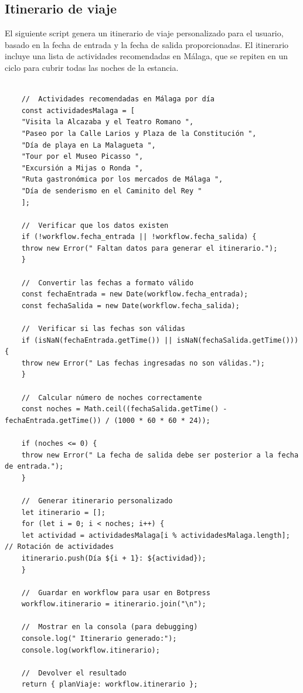 \documentclass[12pt]{article}
\begin{document}
\subsection{Itinerario de viaje}

El siguiente script genera un itinerario de viaje personalizado para el usuario, basado en la fecha de entrada y la fecha de salida proporcionadas.
El itinerario incluye una lista de actividades recomendadas en Málaga, que se repiten en un ciclo para cubrir todas las noches de la estancia.

\begin{verbatim}

    //  Actividades recomendadas en Málaga por día
    const actividadesMalaga = [
    "Visita la Alcazaba y el Teatro Romano ",
    "Paseo por la Calle Larios y Plaza de la Constitución ",
    "Día de playa en La Malagueta ",
    "Tour por el Museo Picasso ",
    "Excursión a Mijas o Ronda ",
    "Ruta gastronómica por los mercados de Málaga ",
    "Día de senderismo en el Caminito del Rey "
    ];

    //  Verificar que los datos existen
    if (!workflow.fecha_entrada || !workflow.fecha_salida) {
    throw new Error(" Faltan datos para generar el itinerario.");
    }

    //  Convertir las fechas a formato válido
    const fechaEntrada = new Date(workflow.fecha_entrada);
    const fechaSalida = new Date(workflow.fecha_salida);

    //  Verificar si las fechas son válidas
    if (isNaN(fechaEntrada.getTime()) || isNaN(fechaSalida.getTime())) {
    throw new Error(" Las fechas ingresadas no son válidas.");
    }

    //  Calcular número de noches correctamente
    const noches = Math.ceil((fechaSalida.getTime() - fechaEntrada.getTime()) / (1000 * 60 * 60 * 24));

    if (noches <= 0) {
    throw new Error(" La fecha de salida debe ser posterior a la fecha de entrada.");
    }

    //  Generar itinerario personalizado
    let itinerario = [];
    for (let i = 0; i < noches; i++) {
    let actividad = actividadesMalaga[i % actividadesMalaga.length]; // Rotación de actividades
    itinerario.push(Día ${i + 1}: ${actividad});
    }

    //  Guardar en workflow para usar en Botpress
    workflow.itinerario = itinerario.join("\n");

    //  Mostrar en la consola (para debugging)
    console.log(" Itinerario generado:");
    console.log(workflow.itinerario);

    //  Devolver el resultado
    return { planViaje: workflow.itinerario };

\end{verbatim}
\end{document}
